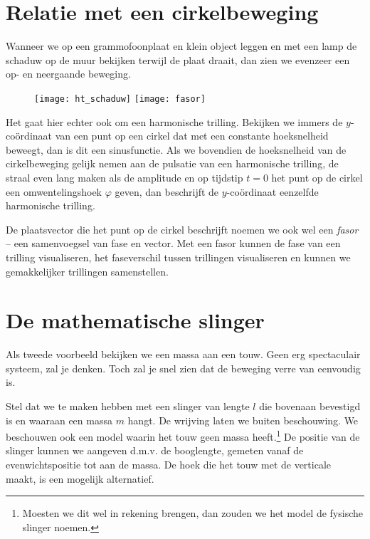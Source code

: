 
\section{Relatie met een cirkelbeweging}

Wanneer we op een grammofoonplaat en klein object leggen en met een lamp de schaduw op de muur bekijken terwijl de plaat draait, dan zien we evenzeer een op- en neergaande beweging. 
\begin{figure}[h]
\texttt{[image: ht\_schaduw]}
\hspace{5mm}
\texttt{[image: fasor]}
\end{figure}
Het gaat hier echter ook om een harmonische trilling. Bekijken we immers de $y$-co\"ordinaat van een punt op een cirkel dat met een constante hoeksnelheid beweegt, dan is dit een sinusfunctie. Als we bovendien de hoeksnelheid van de cirkelbeweging gelijk nemen aan de pulsatie van een harmonische trilling, de straal even lang maken als de amplitude en op tijdstip $t=0$ het punt op de cirkel een omwentelingshoek $\varphi$ geven, dan beschrijft de $y$-co\"ordinaat eenzelfde harmonische trilling. 

De plaatsvector die het punt op de cirkel beschrijft noemen we ook wel een \emph{fasor} -- een samenvoegsel van fase en vector. Met een fasor kunnen de fase van een trilling visualiseren, het faseverschil tussen trillingen visualiseren en kunnen we gemakkelijker trillingen samenstellen. 


\section{De mathematische slinger}

Als tweede voorbeeld bekijken we een massa aan een touw. Geen erg spectaculair systeem, zal je denken. Toch zal je snel zien dat de beweging verre van eenvoudig is.

Stel dat we te maken hebben met een slinger van lengte $l$ die bovenaan bevestigd is en waaraan een massa $m$ hangt. De wrijving laten we buiten beschouwing. We beschouwen ook een model waarin het touw geen massa heeft.\footnote{Moesten we dit wel in rekening brengen, dan zouden we het model de fysische slinger noemen.} De positie van de slinger kunnen we aangeven d.m.v. de booglengte, gemeten vanaf de evenwichtspositie tot aan de massa. De hoek die het touw met de verticale maakt, is een mogelijk alternatief. 

